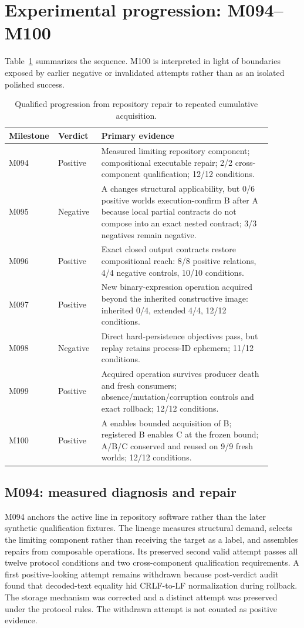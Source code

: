 \documentclass[10pt]{article}
\begin{document}
\section{Experimental progression: M094--M100}
Table~\ref{tab:milestones} summarizes the sequence. M100 is interpreted in light of boundaries exposed by earlier negative or invalidated attempts rather than as an isolated polished success.

\begin{table}[ht]
\centering
\small
\caption{Qualified progression from repository repair to repeated cumulative acquisition.}
\label{tab:milestones}
\begin{tabular}{@{}p{0.10\linewidth}p{0.16\linewidth}p{0.63\linewidth}@{}}
\toprule
Milestone & Verdict & Primary evidence \\
\midrule
M094 & Positive & Measured limiting repository component; compositional executable repair; 2/2 cross-component qualification; 12/12 conditions. \\
M095 & Negative & A changes structural applicability, but 0/6 positive worlds execution-confirm B after A because local partial contracts do not compose into an exact nested contract; 3/3 negatives remain negative. \\
M096 & Positive & Exact closed output contracts restore compositional reach: 8/8 positive relations, 4/4 negative controls, 10/10 conditions. \\
M097 & Positive & New binary-expression operation acquired beyond the inherited constructive image: inherited 0/4, extended 4/4, 12/12 conditions. \\
M098 & Negative & Direct hard-persistence objectives pass, but replay retains process-ID ephemera; 11/12 conditions. \\
M099 & Positive & Acquired operation survives producer death and fresh consumers; absence/mutation/corruption controls and exact rollback; 12/12 conditions. \\
M100 & Positive & A enables bounded acquisition of B; registered B enables C at the frozen bound; A/B/C conserved and reused on 9/9 fresh worlds; 12/12 conditions. \\
\bottomrule
\end{tabular}
\end{table}

\subsection{M094: measured diagnosis and repair}
M094 anchors the active line in repository software rather than the later synthetic qualification fixtures. The lineage measures structural demand, selects the limiting component rather than receiving the target as a label, and assembles repairs from composable operations. Its preserved second valid attempt passes all twelve protocol conditions and two cross-component qualification requirements. A first positive-looking attempt remains withdrawn because post-verdict audit found that decoded-text equality hid CRLF-to-LF normalization during rollback. The storage mechanism was corrected and a distinct attempt was preserved under the protocol rules. The withdrawn attempt is not counted as positive evidence.
\end{document}
